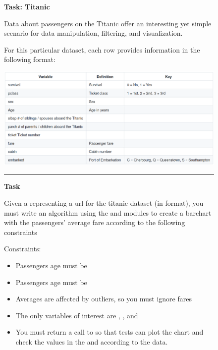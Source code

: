 

\begin{figure}
\begin{mdframed}[backgroundcolor=gray!04] 
\begin{scriptsize}

{\large \textbf{Task: Titanic}} \bigskip


Data about passengers on the Titanic offer an interesting yet simple scenario for data manipulation, filtering, and visualization. \medskip


For this particular dataset, each row provides information in the following format:

\medskip

\includegraphics[width=\textwidth]{appendix/cp6/titanic-table.png}

\medskip




\begin{center}
\rule{10cm}{0.4pt}
\end{center}

\textbf{Task} \medskip

Given a  representing a url for the titanic dataset (in  format), you must write an algorithm using the  and  modules to create a barchart with the passengers' average fare according to the following constraints \medskip


Constraints:

\begin{itemize}


    \item Passengers age must be 

    \item  Passengers age must be 

    \item Averages are affected by outliers, so you must ignore fares 

    \item  The only variables of interest are , , and 

    \item You must return a call to  so that tests can plot the chart and check the values in the  and  according to the data.


\end{itemize}

\end{scriptsize}
\end{mdframed}
\end{figure}
  


